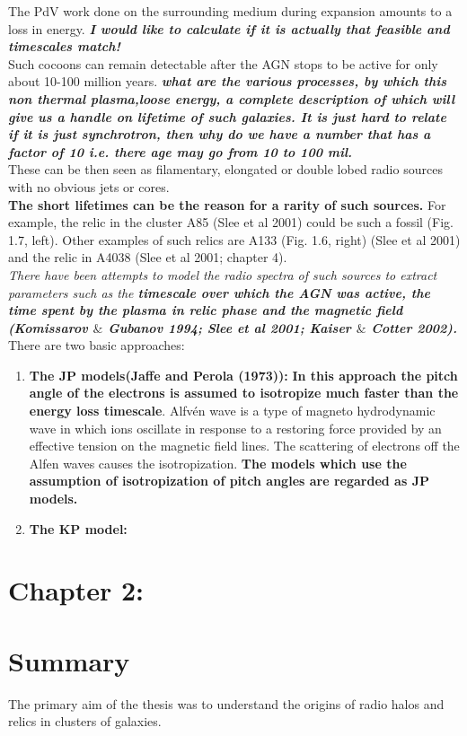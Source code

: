 \documentclass[12pt]{report}
\newcommand{\tbf}[1]{\textbf{#1}}
\newcommand{\tit}[1]{\textit{#1}}
\begin{document}
 The PdV work done on the surrounding medium during expansion amounts to a loss in energy. \tbf{\tit{I would like to calculate if it is actually that feasible and timescales match!}}\\
 
 Such cocoons can remain detectable after the AGN stops to be active for only about 10-100 million years.
\tbf{\tit{what are the various processes, by which this non thermal plasma,loose energy, a complete description of which will give us a handle on lifetime of such galaxies. It is just hard to relate if it is just synchrotron, then why do we have a number that has a factor of 10 i.e. there age may go from 10 to 100 mil.}} \\
  These can be then seen as filamentary, elongated or double
lobed radio sources with no obvious jets or cores. \\
\textbf{The short lifetimes can be the reason for a rarity of such sources. }For example, the relic in the cluster A85 (Slee
et al 2001) could be such a fossil (Fig. 1.7, left). Other examples of such relics are A133 (Fig. 1.6, right) (Slee et al 2001) and the relic in A4038 (Slee et al 2001; chapter 4).\\
\tit{There have been attempts to model the radio spectra of such sources to extract parameters such as the \tbf{timescale over which the AGN was active, the time spent by the plasma in relic phase and the magnetic field (Komissarov $\&$ Gubanov 1994; Slee et al 2001; Kaiser $\&$ Cotter 2002).} } There are two basic approaches:
\begin{enumerate}
\item \tbf{The JP models(Jaffe and Perola (1973)):}\textbf{ In this approach the pitch angle of the electrons is assumed to isotropize much faster than the energy loss timescale}. Alfvén wave is a type of magneto hydrodynamic wave in which ions oscillate in response to a restoring force provided by an effective tension on the magnetic field lines. The scattering of electrons off the Alfen waves causes the isotropization. \tbf{ The models which use the assumption of isotropization of pitch angles are regarded as JP models.}
\item \tbf{The KP model:}
\end{enumerate}

\section{Chapter 2:}
\section{Summary}
The primary aim of the thesis was to understand
the origins of radio halos and relics in clusters of galaxies. 
\end{document}
